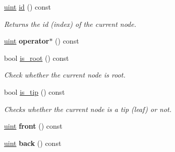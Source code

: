 \begin{DoxyCompactItemize}
\item 
\hyperlink{namespacepruner_a659e6e64a9e2b8e981c3d34262a2f67e}{uint} \hyperlink{classpruner_1_1TreeIterator_ae76ec4f2c1390d72889f78a51d65d19c}{id} () const \hypertarget{classpruner_1_1TreeIterator_ae76ec4f2c1390d72889f78a51d65d19c}{}\label{classpruner_1_1TreeIterator_ae76ec4f2c1390d72889f78a51d65d19c}

\begin{DoxyCompactList}\small\item\em Returns the id (index) of the current node. \end{DoxyCompactList}\item 
\hyperlink{namespacepruner_a659e6e64a9e2b8e981c3d34262a2f67e}{uint} {\bfseries operator$\ast$} () const \hypertarget{classpruner_1_1TreeIterator_aef11103dd885ef9a0865644e5c6df945}{}\label{classpruner_1_1TreeIterator_aef11103dd885ef9a0865644e5c6df945}

\item 
bool \hyperlink{classpruner_1_1TreeIterator_a641055ff6b66b09cc6b4826e3b826b28}{is\+\_\+root} () const \hypertarget{classpruner_1_1TreeIterator_a641055ff6b66b09cc6b4826e3b826b28}{}\label{classpruner_1_1TreeIterator_a641055ff6b66b09cc6b4826e3b826b28}

\begin{DoxyCompactList}\small\item\em Check whether the current node is root. \end{DoxyCompactList}\item 
bool \hyperlink{classpruner_1_1TreeIterator_a08d3a3504b7fac8c0690ab4f9bc8290a}{is\+\_\+tip} () const \hypertarget{classpruner_1_1TreeIterator_a08d3a3504b7fac8c0690ab4f9bc8290a}{}\label{classpruner_1_1TreeIterator_a08d3a3504b7fac8c0690ab4f9bc8290a}

\begin{DoxyCompactList}\small\item\em Checks whether the current node is a tip (leaf) or not. \end{DoxyCompactList}\item 
\hyperlink{namespacepruner_a659e6e64a9e2b8e981c3d34262a2f67e}{uint} {\bfseries front} () const \hypertarget{classpruner_1_1TreeIterator_ae2db13b649fed318efb85eb84209c9d1}{}\label{classpruner_1_1TreeIterator_ae2db13b649fed318efb85eb84209c9d1}

\item 
\hyperlink{namespacepruner_a659e6e64a9e2b8e981c3d34262a2f67e}{uint} {\bfseries back} () const \hypertarget{classpruner_1_1TreeIterator_a6916561fe4515aa88b4af8344b16c1fd}{}\label{classpruner_1_1TreeIterator_a6916561fe4515aa88b4af8344b16c1fd}

\end{DoxyCompactItemize}
